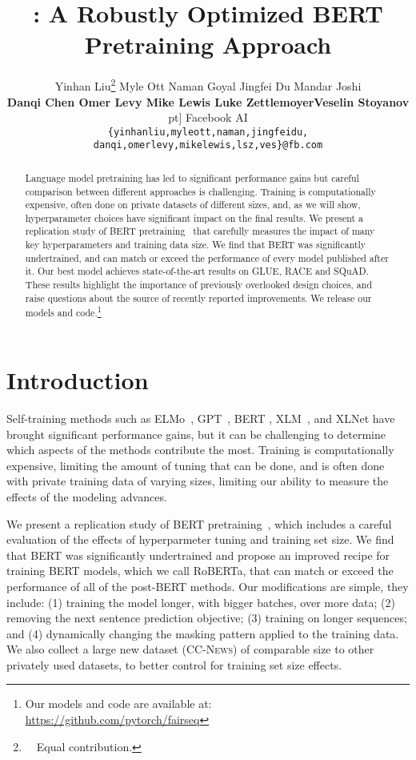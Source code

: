 \documentclass[11pt]{article}
\title{\ourmodel{}: A Robustly Optimized BERT Pretraining Approach}
\author{Yinhan Liu\thanks{~~Equal contribution.}  \quad Myle Ott \quad Naman Goyal \quad Jingfei Du \quad Mandar Joshi\\
{ \bf Danqi Chen \quad Omer Levy \quad Mike Lewis \quad Luke Zettlemoyer\quad Veselin Stoyanov} \4pt]
 Facebook AI \\
{\tt \{yinhanliu,myleott,naman,jingfeidu,}\\
{\tt \quad\quad\quad\quad danqi,omerlevy,mikelewis,lsz,ves\}@fb.com}
}
\date{}
\newcommand{\ourmodel}{RoBERTa}
\begin{document}
\maketitle

\begin{abstract}

Language model pretraining has led to significant performance gains but careful comparison between different approaches is challenging.
Training is computationally expensive, often done on private datasets of different sizes, and, as we will show, hyperparameter choices have significant impact on the final results. 
We present a replication study of BERT pretraining~\cite{devlin2018bert} that carefully measures the impact of many key hyperparameters and training data size. We find that BERT was significantly undertrained, and can match or exceed the performance of every model published after it. Our best model achieves state-of-the-art results on GLUE, RACE and SQuAD.
These results highlight the importance of previously overlooked design choices, and raise questions about the source of recently reported improvements. We release our models and code.\footnote{Our models and code are available at: \\
\url{https://github.com/pytorch/fairseq}}

\end{abstract} \section{Introduction}
\label{intro}

Self-training methods such as ELMo~\cite{peters2018deep}, GPT~\cite{radford2018gpt}, BERT \cite{devlin2018bert}, XLM~\cite{lample2019cross}, and XLNet \cite{yang2019xlnet} have brought significant performance gains, but it can be challenging to determine which aspects of the methods contribute the most. Training is computationally expensive, limiting the amount of tuning that can be done, and is often done with private training data of varying sizes, limiting our ability to measure the effects of the modeling advances. 


We present a replication study of BERT pretraining~\cite{devlin2018bert}, which includes a careful evaluation of the effects of hyperparmeter tuning and training set size. We find that BERT was significantly undertrained and propose an improved recipe for training BERT models, which we call \ourmodel{}, that can match or exceed the performance of all of the post-BERT methods.
Our modifications are simple, they include: (1) training the model longer, with bigger batches, over more data; (2) removing the next sentence prediction objective; (3) training on longer sequences; and (4) dynamically changing the masking pattern applied to the training data. We also collect a large new dataset (\textsc{CC-News}) of comparable size to other privately used datasets, to better control for training set size effects. 
\end{document}
